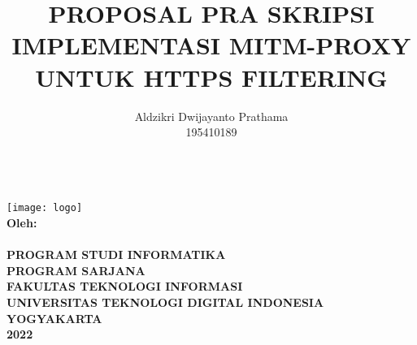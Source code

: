 \documentclass[../PROPOSAL_PRA_SKRIPSI_ALDZIKRI_DWIJAYANTO_PRATHAMA.tex]{subfiles}
\begin{document}
\title{{\large PROPOSAL PRA SKRIPSI\\
  \Large{IMPLEMENTASI MITM-PROXY UNTUK HTTPS FILTERING}}}
\author{Aldzikri Dwijayanto Prathama
    \\195410189}
\makeatletter
\begin{titlepage}
    \begin{center}
        {\huge \bfseries \@title}\\[14ex]
        \texttt{[image: logo]}\\[4ex]
        {\large \bfseries Oleh:\\ \@author}\\[12ex]
        {\large \bfseries {PROGRAM STUDI INFORMATIKA\\
        PROGRAM SARJANA\\
        FAKULTAS TEKNOLOGI INFORMASI\\
        UNIVERSITAS TEKNOLOGI DIGITAL INDONESIA\\
        YOGYAKARTA\\
        2022}}
    \end{center}
\end{titlepage}
\makeatother
\end{document}
